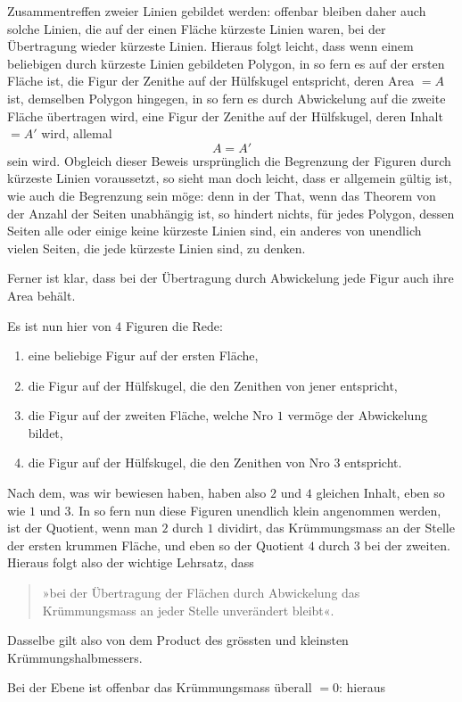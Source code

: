 %
Zusammentreffen zweier Linien gebildet werden: offenbar bleiben daher auch solche Linien, die auf der einen Fläche kürzeste Linien waren, bei der Übertragung wieder kürzeste Linien. Hieraus folgt leicht, dass wenn einem beliebigen durch kürzeste Linien gebildeten Polygon, in so fern es auf der ersten Fläche ist, die Figur der Zenithe auf der Hülfskugel entspricht, deren Area $=A$ ist, demselben Polygon hingegen, in so fern es durch Abwickelung auf die zweite Fläche übertragen wird, eine Figur der Zenithe auf der Hülfskugel, deren Inhalt $=A'$ wird, allemal
\[
A=A'
\]
sein wird. Obgleich dieser Beweis ursprünglich die Begrenzung der Figuren durch kürzeste Linien voraussetzt, so sieht man doch leicht, dass er allgemein gültig ist, wie auch die Begrenzung sein möge: denn in der That, wenn das Theorem von der Anzahl der Seiten unabhängig ist, so hindert nichts, für jedes Polygon, dessen Seiten alle oder einige keine kürzeste Linien sind, ein anderes von unendlich vielen Seiten, die jede kürzeste Linien sind, zu denken.

Ferner ist klar, dass bei der Übertragung durch Abwickelung jede Figur auch ihre Area behält.

Es ist nun hier von $4$ Figuren die Rede:
\begin{enumerate}
\item[1)] eine beliebige Figur auf der ersten Fläche,
\item[2)] die Figur auf der Hülfskugel, die den Zenithen von jener entspricht,
\item[3)] die Figur auf der zweiten Fläche, welche Nro $1$ vermöge der Abwickelung bildet,
\item[4)] die Figur auf der Hülfskugel, die den Zenithen von Nro $3$ entspricht.
\end{enumerate}
\noindent\hspace*{1.2em}Nach dem, was wir bewiesen haben, haben also $2$ und $4$ gleichen Inhalt, eben so wie $1$ und $3$. In so fern nun diese Figuren unendlich klein angenommen werden, ist der Quotient, wenn man $2$ durch $1$ dividirt, das Krümmungsmass an der Stelle der ersten krummen Fläche, und eben so der Quotient $4$ durch $3$ bei der zweiten. Hieraus folgt also der wichtige Lehrsatz, dass
\begin{quote}
»bei der Übertragung der Flächen durch Abwickelung das Krümmungsmass an jeder Stelle unverändert bleibt«.
\end{quote}
\noindent Dasselbe gilt also von dem Product des grössten und kleinsten Krümmungshalbmessers.

Bei der Ebene ist offenbar das Krümmungsmass überall $=0$: hieraus
